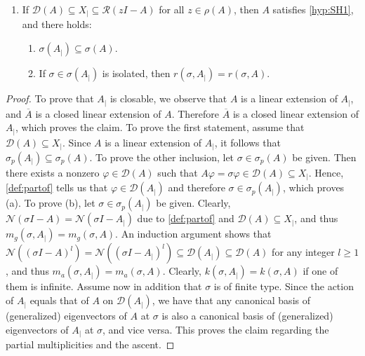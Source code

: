 \documentclass[english]{myarticle}
\begin{document}
\begin{sloppypar}
\begin{proposition}
\begin{enumerate}
    \item If $\mathcal{D}(A) \subseteq X_{|} \subseteq \mathcal{R}(zI-A)$ for all $z \in \rho(A)$, then $A$ satisfies \ref{hyp:SH1}, and there holds:
    \begin{enumerate}
        \item $\sigma(A_{|}) \subseteq \sigma(A)$.
        \item If $\sigma \in \sigma(A_{|})$ is isolated, then $r(\sigma,A_{|}) = r(\sigma,A)$.
    \end{enumerate}
\end{enumerate}
\end{proposition}
\begin{proof}
To prove that $A_{|}$ is closable, we observe that $A$ is a linear extension of $A_{|}$, and $\overline{A}$ is a closed linear extension of $A$. Therefore $\overline{A}$ is a closed linear extension of $A_{|}$, which proves the claim. To prove the first statement, assume that $\mathcal{D}(A) \subseteq X_{|}$. Since $A$ is a linear extension of $A_{|}$, it follows that $\sigma_p(A_{|}) \subseteq \sigma_p(A)$. To prove the other inclusion, let $\sigma \in \sigma_p(A)$ be given. Then there exists a nonzero $\varphi \in \mathcal{D}(A)$ such that $A \varphi = \sigma \varphi \in \mathcal{D}(A) \subseteq X_{|}$. Hence, \cref{def:partof} tells us that $\varphi \in \mathcal{D}(A_{|})$ and therefore $\sigma \in \sigma_p(A_{|})$, which proves (a). To prove (b), let $\sigma \in \sigma_p(A_{|})$ be given. Clearly, $\mathcal{N}(\sigma I-A) = \mathcal{N}(\sigma I-A_{|})$ due to \cref{def:partof} and $\mathcal{D}(A) \subseteq X_{|}$, and thus $m_g(\sigma, A_{|}) = m_g(\sigma, A)$. An induction argument shows that $\mathcal{N}((\sigma I - A)^l) = \mathcal{N}((\sigma I - A_{|})^l) \subseteq \mathcal{D}(A_{|}) \subseteq \mathcal{D}(A)$ for any integer $l \geq 1$, and thus $m_a(\sigma,A_{|}) = m_a(\sigma,A)$. Clearly, $k(\sigma,A_{|}) = k(\sigma,A)$ if one of them is infinite. Assume now in addition that $\sigma$ is of finite type. Since the action of $A_{|}$ equals that of $A$ on $\mathcal{D}(A_{|})$, we have that any canonical basis of (generalized) eigenvectors of $A$ at $\sigma$ is also a canonical basis of (generalized) eigenvectors of $A_{|}$ at $\sigma$, and vice versa. This proves the claim regarding the partial multiplicities and the ascent.


\end{proof}
\end{sloppypar}
\end{document}
